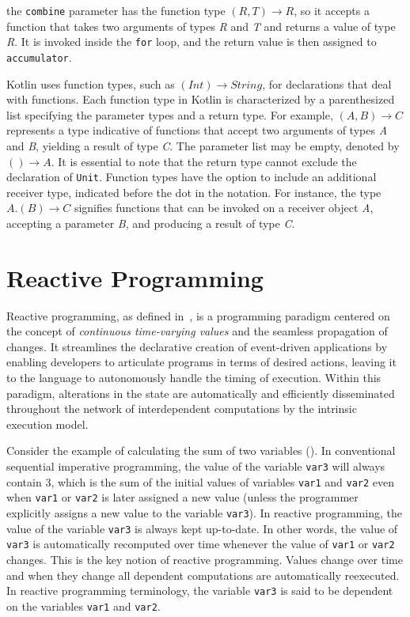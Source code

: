 the \texttt{combine} parameter has the function type \((R, T) \rightarrow R\), so it accepts a function that takes two arguments of types \textit{R} and \textit{T} and returns a value of type \textit{R}. It is invoked inside the \texttt{for} loop, and the return value is then assigned to \texttt{accumulator}.

Kotlin uses function types, such as \((Int) \rightarrow String\), for declarations that deal with functions. Each function type in Kotlin is characterized by a parenthesized list specifying the parameter types and a return type. For example, \((A, B) \rightarrow C\) represents a type indicative of functions that accept two arguments of types \textit{A} and \textit{B}, yielding a result of type \textit{C}. The parameter list may be empty, denoted by \(() \rightarrow A\). It is essential to note that the return type cannot exclude the declaration of \texttt{Unit}. Function types have the option to include an additional receiver type, indicated before the dot in the notation. For instance, the type \(A.(B) \rightarrow C\) signifies functions that can be invoked on a receiver object \textit{A}, accepting a parameter \textit{B}, and producing a result of type \textit{C}.

\section{Reactive Programming}
\label{section:reactive-programming}

Reactive programming, as defined in~\cite{Bainomugisha2013}, is a programming paradigm centered on the concept of \textit{continuous time-varying values} and the seamless propagation of changes. It streamlines the declarative creation of event-driven applications by enabling developers to articulate programs in terms of desired actions, leaving it to the language to autonomously handle the timing of execution. Within this paradigm, alterations in the state are automatically and efficiently disseminated throughout the network of interdependent computations by the intrinsic execution model.

Consider the example of calculating the sum of two variables (). In conventional sequential imperative programming, the value of the variable \texttt{var3} will always contain 3, which is the sum of the initial values of variables \texttt{var1} and \texttt{var2} even when \texttt{var1} or \texttt{var2} is later assigned a new value (unless the programmer explicitly assigns a new value to the variable \texttt{var3}). In reactive programming, the value of the variable \texttt{var3} is always kept up-to-date. In other words, the value of \texttt{var3} is automatically recomputed over time whenever the value of \texttt{var1} or \texttt{var2} changes.
This is the key notion of reactive programming. Values change over time and when they change all dependent computations are automatically reexecuted. In reactive programming terminology, the variable \texttt{var3} is said to be dependent on the variables \texttt{var1} and \texttt{var2}.

